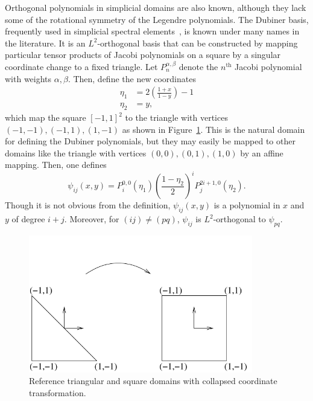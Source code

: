 Orthogonal polynomials in simplicial domains are also known, although
they lack some of the rotational symmetry of the Legendre polynomials.
The Dubiner basis, frequently used in simplicial spectral
elements~\citep{Dubiner1991}, is known under many names in the literature.  It is
an \( L^2 \)-orthogonal basis that can be constructed by mapping particular
tensor products of Jacobi polynomials on a square by a singular
coordinate change to a fixed triangle.
Let \( P^{\alpha,\beta}_n \) denote the \( n^\mathrm{th} \) Jacobi
polynomial with weights \( \alpha, \beta \).  Then, define the
new coordinates
\begin{equation}
\label{eq:dubcoord}
\begin{split}
\eta_1 & = 2\left(\frac{1+x}{1-y}\right)-1 \\
\eta_2 & = y,
\end{split}
\end{equation}
which map the square \( [-1,1]^2 \) to the triangle with
vertices \( (-1,-1),(-1,1),(1,-1) \) as shown in Figure~\ref{fig:tricoord}.  This
is the natural domain for defining the Dubiner polynomials, but they
may easily be mapped to other domains like the triangle with
vertices
\( (0,0) , (0,1) , (1,0) \) by an affine mapping.
Then, one defines
\begin{equation}
\psi_{ij}(x,y) = P_i^{0,0}(\eta_1) \left( \frac{1-\eta_2}{2}
\right)^i P_j^{2i+1,0}(\eta_2).
\end{equation}
Though it is not obvious from the definition, \( \psi_{ij}(x,y) \) is
a polynomial in \( x \) and \( y \) of degree \( i + j \).  Moreover,
for \( (ij) \neq (pq) \), \( \psi_{ij} \) is \( L^2 \)-orthogonal to \(
\psi_{pq} \).

\begin{figure}
\begin{center}
\includegraphics[height=6cm]{chapters/kirby-1/pdf/tricoord.pdf} 
\end{center}
\caption{Reference triangular and square domains with collapsed
  coordinate transformation.}
\label{fig:tricoord}
\end{figure}


